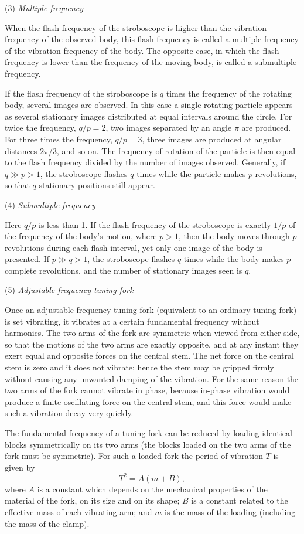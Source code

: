 (3) \textit{Multiple frequency}

When the flash frequency of the stroboscope is higher than the vibration frequency of the observed body, this flash frequency is called a multiple frequency of the vibration frequency of the body. The opposite case, in which the flash frequency is lower than the frequency of the moving body, is called a submultiple frequency.

If the flash frequency of the stroboscope is $q$ times the frequency of the rotating body, several images are observed. In this case a single rotating particle appears as several stationary images distributed at equal intervals around the circle. For twice the frequency, $q/p=2$, two images separated by an angle $\pi$ are produced. For three times the frequency, $q/p=3$, three images are produced at angular distances $2\pi/3$, and so on. The frequency of rotation of the particle is then equal to the flash frequency divided by the number of images observed. Generally, if $q\gg p>1$, the stroboscope flashes $q$ times while the particle makes $p$ revolutions, so that $q$ stationary positions still appear.

(4) \textit{Submultiple frequency}

Here $q/p$ is less than 1. If the flash frequency of the stroboscope is exactly $1/p$ of the frequency of the body's motion, where $p>1$, then the body moves through $p$ revolutions during each flash interval, yet only one image of the body is presented. If $p\gg q>1$, the stroboscope flashes $q$ times while the body makes $p$ complete revolutions, and the number of stationary images seen is $q$.

(5) \textit{Adjustable-frequency tuning fork}

Once an adjustable-frequency tuning fork (equivalent to an ordinary tuning fork) is set vibrating, it vibrates at a certain fundamental frequency without harmonics. The two arms of the fork are symmetric when viewed from either side, so that the motions of the two arms are exactly opposite, and at any instant they exert equal and opposite forces on the central stem. The net force on the central stem is zero and it does not vibrate; hence the stem may be gripped firmly without causing any unwanted damping of the vibration. For the same reason the two arms of the fork cannot vibrate in phase, because in-phase vibration would produce a finite oscillating force on the central stem, and this force would make such a vibration decay very quickly.

The fundamental frequency of a tuning fork can be reduced by loading identical blocks symmetrically on its two arms (the blocks loaded on the two arms of the fork must be symmetric). For such a loaded fork the period of vibration $T$ is given by
\begin{equation*}
T^{2}=A(m+B),
\end{equation*}
where $A$ is a constant which depends on the mechanical properties of the material of the fork, on its size and on its shape; $B$ is a constant related to the effective mass of each vibrating arm; and $m$ is the mass of the loading (including the mass of the clamp).

